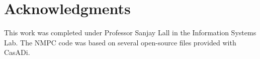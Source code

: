 \documentclass[conference]{IEEEtran}
\begin{document}







\section{Acknowledgments}

This work was completed under Professor Sanjay Lall in the Information Systems Lab. The NMPC code was based on several open-source files provided with CasADi.




\end{document}
